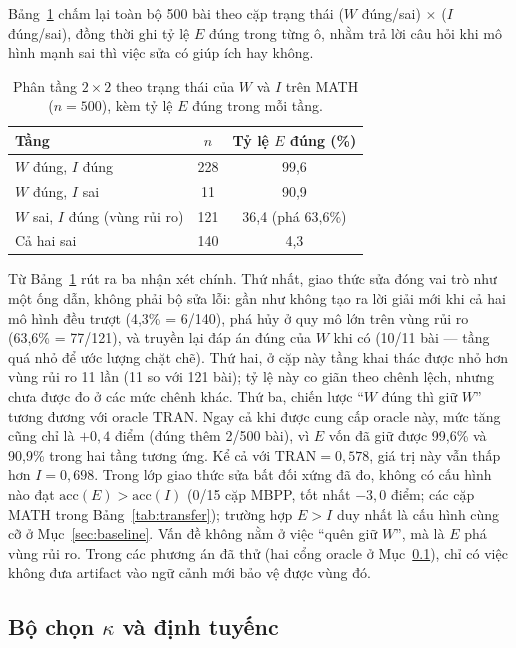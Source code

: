\documentclass[12pt,a4paper]{article}
\newcommand{\CEIL}{\mathrm{TRAN}}
\newcommand{\acc}{\mathrm{acc}}
\begin{document}
Bảng~\ref{tab:222} chấm lại toàn bộ 500 bài theo cặp trạng thái (\(W\) đúng/sai) \(\times\) (\(I\) đúng/sai), đồng thời ghi tỷ lệ \(E\) đúng trong từng ô, nhằm trả lời câu hỏi khi mô hình mạnh sai thì việc sửa có giúp ích hay không.

\begin{table}[htbp]
\centering
\small
\begin{tabular}{@{}l c c@{}}
\toprule
Tầng & \(n\) & Tỷ lệ \(E\) đúng (\%) \\
\midrule
\(W\) đúng, \(I\) đúng & 228 & 99,6\\
\(W\) đúng, \(I\) sai & 11 & 90,9\\
\(W\) sai, \(I\) đúng (vùng rủi ro) & 121 & 36,4 \quad (phá 63,6\%)\\
Cả hai sai & 140 & 4,3\\
\bottomrule
\end{tabular}
\caption{Phân tầng \(2\times 2\) theo trạng thái của \(W\) và \(I\) trên MATH (\(n=500\)), kèm tỷ lệ \(E\) đúng trong mỗi tầng.}
\label{tab:222}
\end{table}

Từ Bảng~\ref{tab:222} rút ra ba nhận xét chính. Thứ nhất, giao thức sửa đóng vai trò như một ống dẫn, không phải bộ sửa lỗi: gần như không tạo ra lời giải mới khi cả hai mô hình đều trượt (4,3\% = 6/140), phá hủy ở quy mô lớn trên vùng rủi ro (63,6\% = 77/121), và truyền lại đáp án đúng của \(W\) khi có (10/11 bài --- tầng quá nhỏ để ước lượng chặt chẽ). Thứ hai, ở cặp này tầng khai thác được nhỏ hơn vùng rủi ro 11 lần (11 so với 121 bài); tỷ lệ này co giãn theo chênh lệch, nhưng chưa được đo ở các mức chênh khác. Thứ ba, chiến lược “\(W\) đúng thì giữ \(W\)” tương đương với oracle \(\CEIL\). Ngay cả khi được cung cấp oracle này, mức tăng cũng chỉ là \(+0{,}4\) điểm (đúng thêm 2/500 bài), vì \(E\) vốn đã giữ được 99,6\% và 90,9\% trong hai tầng tương ứng. Kể cả với \(\CEIL = 0{,}578\), giá trị này vẫn thấp hơn \(I = 0{,}698\). Trong lớp giao thức sửa bất đối xứng đã đo, không có cấu hình nào đạt \(\acc(E) > \acc(I)\) (0/15 cặp MBPP, tốt nhất \(-3{,}0\) điểm; các cặp MATH trong Bảng~\ref{tab:transfer}); trường hợp \(E>I\) duy nhất là cấu hình cùng cỡ ở Mục~\ref{sec:baseline}. Vấn đề không nằm ở việc “quên giữ \(W\)”, mà là \(E\) phá vùng rủi ro. Trong các phương án đã thử (hai cổng oracle ở Mục~\ref{sec:kappa}), chỉ có việc không đưa artifact vào ngữ cảnh mới bảo vệ được vùng đó.

\subsection{Bộ chọn \(\kappa\) và định tuyếnc}\label{sec:kappa}
\end{document}
